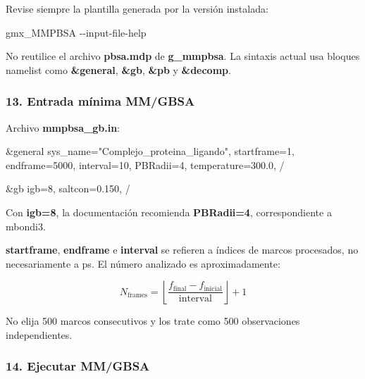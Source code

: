 \documentclass[
  spanish,
  11pt,
  a4paper]{article}
\newenvironment{Shaded}{\begin{snugshade}}{\end{snugshade}}
\newcommand{\AttributeTok}[1]{\textcolor[rgb]{0.13,0.29,0.53}{#1}}
\newcommand{\ExtensionTok}[1]{#1}
\newcommand{\NormalTok}[1]{#1}
\begin{document}
Revise siempre la plantilla generada por la versión instalada:

\begin{Shaded}
\begin{Highlighting}[]
\ExtensionTok{gmx\_MMPBSA} \AttributeTok{{-}{-}input{-}file{-}help}
\end{Highlighting}
\end{Shaded}

No reutilice el archivo \textbf{pbsa.mdp} de \textbf{g\_mmpbsa}. La
sintaxis actual usa bloques namelist como \textbf{\&general},
\textbf{\&gb}, \textbf{\&pb} y \textbf{\&decomp}.

\subsubsection{13. Entrada mínima
MM/GBSA}\label{entrada-muxednima-mmgbsa}

Archivo \textbf{mmpbsa\_gb.in}:

\begin{Shaded}
\begin{Highlighting}[]
\NormalTok{\&general}
\NormalTok{  sys\_name="Complejo\_proteina\_ligando",}
\NormalTok{  startframe=1,}
\NormalTok{  endframe=5000,}
\NormalTok{  interval=10,}
\NormalTok{  PBRadii=4,}
\NormalTok{  temperature=300.0,}
\NormalTok{/}

\NormalTok{\&gb}
\NormalTok{  igb=8,}
\NormalTok{  saltcon=0.150,}
\NormalTok{/}
\end{Highlighting}
\end{Shaded}

Con \textbf{igb=8}, la documentación recomienda \textbf{PBRadii=4},
correspondiente a mbondi3.

\textbf{startframe}, \textbf{endframe} e \textbf{interval} se refieren a
índices de marcos procesados, no necesariamente a ps. El número
analizado es aproximadamente:

\[
N_{\mathrm{frames}}
=
\left\lfloor
\frac{f_{\mathrm{final}}-f_{\mathrm{inicial}}}
     {\mathrm{interval}}
\right\rfloor+1
\]

No elija 500 marcos consecutivos y los trate como 500 observaciones
independientes.

\subsubsection{14. Ejecutar MM/GBSA}\label{ejecutar-mmgbsa}
\end{document}
